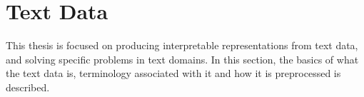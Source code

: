 



















\section{Text Data}

This thesis is focused on producing interpretable representations from text data, and solving specific problems in text domains. In this section, the basics of what the text data is, terminology associated with it and how it is preprocessed is described.


